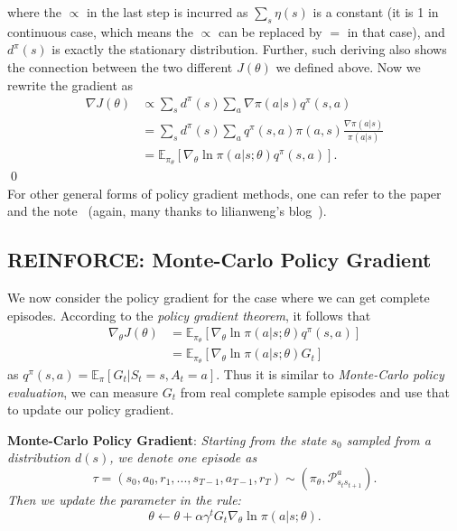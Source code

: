 \documentclass{progartcn}
\begin{document}
		where the $\propto$ in the last step is incurred as $\sum_s\eta(s)$ is a constant (it is 1 in continuous case, which means the $\propto$ can be replaced by $=$ in that case), and $d^\pi(s)$ is exactly the stationary distribution. Further, such deriving also shows the connection between the two different $J(\theta)$ we defined above. Now we rewrite the gradient as
		\begin{align*}
		\nabla J(\theta)&\propto\sum_{s}d^\pi(s)\sum_a\nabla \pi(a|s)q^\pi(s,a)\\
		&=\sum_s d^\pi(s)\sum_a q^\pi(s,a)\pi(a,s)\frac{\nabla \pi(a|s)}{\pi(a|s)}\\
		&=\mathbb{E}_{\pi_\theta}[\nabla_\theta\ln \pi(a|s;\theta)q^\pi(s,a)].
		\end{align*}
		\qed\\

		For other general forms of policy gradient methods, one can refer to the paper~\cite{schulman2015highdimensional} and the note~\cite{notes_GAE} (again, many thanks to lilianweng's blog~\cite{liblog-pga}).\\

	\subsection{REINFORCE: Monte-Carlo Policy Gradient}

		We now consider the policy gradient for the case where we can get complete episodes. According to the \textit{policy gradient theorem}, it follows that
		\begin{align*}
		\nabla_\theta J(\theta)&=\mathbb{E}_{\pi_\theta}[\nabla_\theta\ln \pi(a|s;\theta)q^\pi(s,a)]\\
		&=\mathbb{E}_{\pi_\theta}[\nabla_\theta\ln \pi(a|s;\theta)G_t]
		\end{align*}
		as $q^\pi(s,a)=\mathbb E_\pi[G_t|S_t=s,A_t=a]$. Thus it is similar to \textit{Monte-Carlo policy evaluation}, we can measure $G_t$ from real complete sample episodes and use that to update our policy gradient.

		\textbf{Monte-Carlo Policy Gradient}: \textit{Starting from the state $s_0$ sampled from a distribution $d(s)$, we denote one episode as}
		\[\tau=(s_0,a_0,r_1,...,s_{T-1},a_{T-1},r_T)\sim (\pi_\theta, \mathcal{P}_{s_ts_{t+1}}^a).\]
		\textit{Then we update the parameter in the rule:}
		\[\theta\gets\theta+\alpha\gamma^tG_t\nabla_\theta \ln \pi(a|s;\theta).\]
\end{document}
